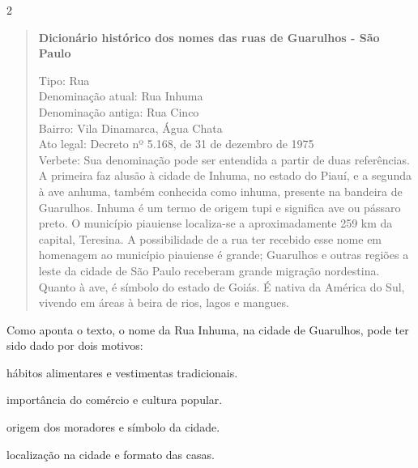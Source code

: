 \begin{itemize}
\num{2}

\begin{quote}
\textbf{Dicionário histórico dos nomes das ruas de Guarulhos - São Paulo}

Tipo: Rua\\
Denominação atual: Rua Inhuma\\
Denominação antiga: Rua Cinco\\
Bairro: Vila Dinamarca, Água Chata\\
Ato legal: Decreto nº 5.168, de 31 de dezembro de 1975\\
Verbete: Sua denominação pode ser entendida a partir de duas
referências. A primeira faz alusão à cidade de Inhuma, no estado do
Piauí, e a segunda à ave anhuma, também conhecida como inhuma, presente
na bandeira de Guarulhos. Inhuma é um termo de origem tupi e significa
ave ou pássaro preto. O município piauiense localiza-se a
aproximadamente 259 km da capital, Teresina. A possibilidade de a rua
ter recebido esse nome em homenagem ao município piauiense é grande;
Guarulhos e outras regiões a leste da cidade de São Paulo receberam
grande migração nordestina. Quanto à ave, é símbolo do estado de Goiás.
É nativa da América do Sul, vivendo em áreas à beira de rios, lagos e
mangues.

\end{quote}

Como aponta o texto, o nome da Rua Inhuma, na cidade de Guarulhos, pode
ter sido dado por dois motivos:

\begin{escolha}
\item hábitos alimentares e vestimentas tradicionais.

\item importância do comércio e cultura popular.

\item origem dos moradores e símbolo da cidade.

\item localização na cidade e formato das casas.
\end{escolha}



\end{itemize}

